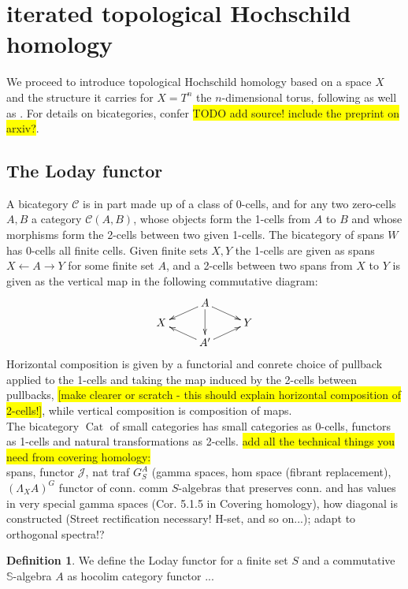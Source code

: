 \documentclass[10pt, a4paper, UKenglish]{article}
\numberwithin{equation}{section}
\newcommand{\cJ}{\mathcal{J}}
\newcommand{\bS}{\mathbb{S}}
\newcommand{\comm}[1]{\colorbox{yellow}{#1}}
\theoremstyle{plain}
\theoremstyle{definition}
\newtheorem{defn}[equation]{Definition}
\begin{document}
\section{iterated topological Hochschild homology}
We proceed to introduce topological Hochschild homology based on a space $X$ and the structure it carries for $X = T^n$ the $n$-dimensional torus, following \cite{brun2010covering} as well as \cite{carlsson2011higher}. For details on bicategories, confer \cite{benabou1967introduction} \comm{TODO add source! include the preprint on arxiv?}.
\subsection{The Loday functor}
A bicategory $\mathcal{C}$ is in part made up of a class of 0-cells, and for any two zero-cells $A,B$ a category $\mathcal{C}(A,B)$, whose objects form the 1-cells from $A$ to $B$ and whose morphisms form the 2-cells between two given 1-cells. The bicategory of spans $W$ has 0-cells all finite cells. Given finite sets $X,Y$ the 1-cells are given as spans $ X \leftarrow A \rightarrow Y$ for some finite set $A$, and a 2-cells between two spans from $X$ to $Y$  is given as the vertical map in the following commutative diagram:
\[
\xymatrix@R-=.5em{
  &
  A \ar[dl] \ar[dd] \ar[dr]
  \\
  X
  &
  &
  Y
  \\
  &
  A^\prime \ar[ul] \ar[ur]
  &
}
\]
Horizontal composition is given by a functorial and conrete choice of pullback applied to the 1-cells and taking the map induced by the 2-cells between pullbacks, \comm{[make clearer or scratch - this should explain horizontal composition of 2-cells!]}, while vertical composition is composition of maps.\\
The bicategory $\operatorname{Cat}$ of small categories has small categories as 0-cells, functors as 1-cells and natural transformations as 2-cells.
\comm{add all the technical things you need from covering homology:}\\
spans, functor $\cJ$, nat traf $G^A_S$ (gamma spaces, hom space (fibrant replacement), $(\Lambda_X A)^G$ functor of conn. comm $S$-algebras that preserves conn. and has values in very special gamma spaces (Cor. 5.1.5 in Covering homology), how diagonal is constructed (Street rectification necessary! H-set, and so on...); adapt to orthogonal spectra!?
\begin{defn}\label{def_loday_functor}
We define the Loday functor for a finite set $S$ and a commutative $\bS$-algebra $A$ as hocolim category functor ...
\end{defn}
\end{document}
